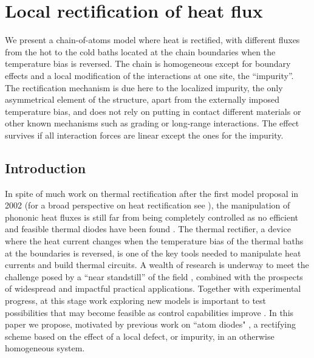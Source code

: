 
\chapter{Local rectification of heat flux}
\label{ChapterLocalRectification}
%
We present a chain-of-atoms model where heat is rectified, with different fluxes from the hot to the cold baths
located at the chain boundaries when the temperature bias is reversed. The chain is homogeneous except for boundary effects
and a local modification of the interactions
at one site, the ``impurity''. The rectification mechanism is due here to the localized impurity, the only asymmetrical element of the structure, apart from the externally imposed temperature bias,  and does not rely on putting in contact different materials or other known mechanisms such as grading or long-range interactions.  The effect survives if all interaction forces are linear except the ones for the impurity.
%
\newpage
%

\section{Introduction}

In spite of much work on thermal rectification
after the first model proposal in 2002 \cite{Terraneo2002} (for a broad perspective on heat rectification
see \cite{Roberts2011,Li2012}), the manipulation of phononic
heat fluxes is still far from being completely controlled as no efficient and feasible thermal diodes have been found \cite{Chen2015,Pereira2017}.
The thermal rectifier, a device where the heat
current changes when the temperature bias of the thermal baths at the boundaries is reversed,
is one of the key tools needed to manipulate heat currents and build thermal circuits.
A wealth of research is underway to meet the challenge posed by  a ``near standstill'' of the field \cite{Chen2015,Pereira2017},
combined with the prospects of widespread and impactful practical applications.
Together with experimental progress, at this stage work exploring new models is important to test possibilities that may become feasible as control capabilities improve \cite{Roberts2011}.
In this paper we propose,
motivated by previous work on ``atom diodes"  \cite{Ruschhaupt2004,Raizen2005}, a rectifying scheme
based on the effect of a local defect, or impurity,
in an otherwise homogeneous system.

